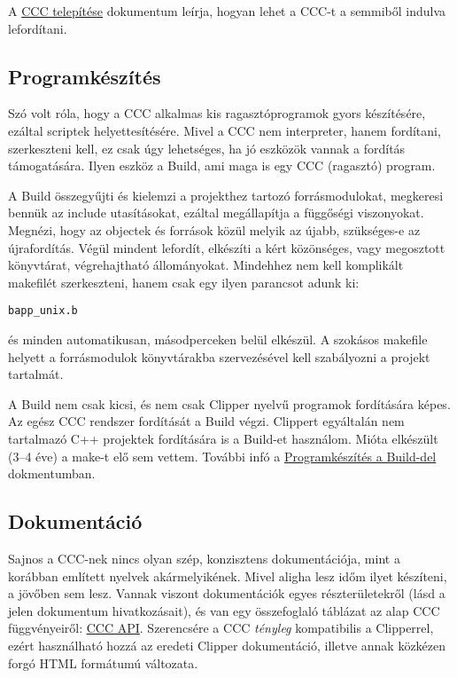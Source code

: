 A  \href{install.html}{CCC telepítése} dokumentum leírja,
hogyan lehet a CCC-t a semmiből indulva lefordítani.


\subsection{Programkészítés}

Szó volt róla, hogy a CCC alkalmas kis ragasztóprogramok 
gyors  készítésére, ezáltal scriptek helyettesítésére.
Mivel a CCC nem interpreter, hanem fordítani, szerkeszteni kell,
ez csak úgy lehetséges, ha jó eszközök vannak a fordítás
támogatására. Ilyen eszköz a Build, ami maga is egy CCC (ragasztó) program.

A Build összegyűjti és kielemzi a projekthez tartozó forrásmodulokat,
megkeresi bennük az include utasításokat, ezáltal megállapítja
a függőségi viszonyokat. Megnézi, hogy az objectek és források
közül melyik az újabb, szükséges-e az újrafordítás.
Végül mindent lefordít, elkészíti a kért közönséges, 
vagy megosztott könyvtárat, végrehajtható állományokat. 
Mindehhez nem kell komplikált makefilét szerkeszteni, 
hanem csak egy ilyen parancsot adunk ki:
\begin{verbatim}
bapp_unix.b
\end{verbatim}
és minden automatikusan, másodperceken belül elkészül. 
A szokásos makefile helyett a forrásmodulok könyvtárakba 
szervezésével kell szabályozni a projekt tartalmát.

A Build nem csak kicsi, és nem csak Clipper nyelvű programok 
fordítására  képes.  Az egész CCC rendszer fordítását a Build végzi.
Clippert egyáltalán nem tartalmazó C++ projektek fordítására
is a Build-et használom. Mióta elkészült (3--4 éve) a make-t elő sem vettem.
További infó a \href{build.html}{Programkészítés a Build-del} dokmentumban.


\subsection{Dokumentáció}

Sajnos a CCC-nek nincs olyan szép, konzisztens dokumentációja, 
mint a korábban említett nyelvek akármelyikének. Mivel aligha
lesz időm ilyet készíteni, a jövőben sem lesz. 
Vannak viszont dokumentációk egyes részterületekről
(lásd a jelen dokumentum hivatkozásait), és van egy összefoglaló
táblázat az alap CCC függvényeiről: 
\href{cccapi.html}{CCC API}.
Szerencsére
a CCC {\em tényleg} kompatibilis a Clipperrel, ezért használható 
hozzá az eredeti Clipper dokumentáció, illetve annak közkézen
forgó HTML formátumú változata. 


